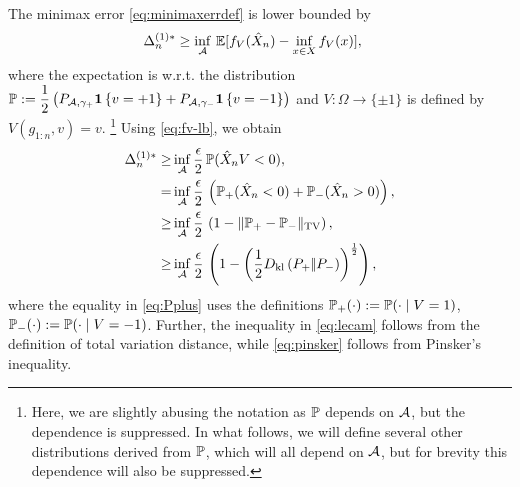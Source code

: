 The minimax error \eqref{eq:minimaxerrdef} is lower bounded by
\begin{align}
\MoveEqLeft 
\Delta_n^{(1)*} %
  \ge  \inf_{\A} \,  \E[f_V(\hat X_n) - \inf_{x \in X}
  f_V(x)],\label{eq:avg-bd}
  \end{align}
where the expectation is w.r.t. the distribution $\P:= \dfrac{1}{2} \left(P_{\A, \gamma_+} \indic{v=+1} + P_{\A, \gamma_-}\indic{v=-1}\right)$ and $V: \Omega \to \{\pm 1 \}$ is defined by $V(g_{1:n},v) = v$.%
\footnote{Here, we are slightly abusing the notation as $\P$ depends on $\A$, but the dependence is suppressed.
In what follows, we will define several other distributions derived from $\P$, which will all depend on $\A$, but
for brevity this dependence will also be suppressed.}
Using \eqref{eq:fv-lb}, we obtain
\begin{align}
\Delta_n^{(1)*}  \ge & \inf_{\A} \dfrac{\epsilon}{2}\,  \P(\hat X_n V < 0), \label{eq:strong-convex-bd}\\
  = & \inf_{\A} \dfrac{\epsilon }{2} \, \left(\P_{+}(\hat X_n < 0) + \P_{-}(\hat X_n > 0)\right), \label{eq:Pplus}\\
  \ge &\inf_{\A} \dfrac{\epsilon }{2} \,\left(1 - \tvnorm{\P_{+}- \P_{-}}\right), \label{eq:lecam}\\
  \ge &\inf_{\A} \dfrac{\epsilon }{2}  \,\left( 1 - \left(\frac12\dkl{P_{+}}{P_{-}}\right)^{\frac{1}{2}}\right), \label{eq:pinsker}
\end{align}
where 
the equality in \eqref{eq:Pplus} uses the definitions $\P_{+}(\cdot)
:= \P(\cdot\mid V=1)$, $\P_{-}(\cdot) := \P(\cdot\mid
V=-1)$. Further, the inequality in \eqref{eq:lecam} follows from the definition of total variation distance, while \eqref{eq:pinsker} follows from Pinsker's inequality. %


